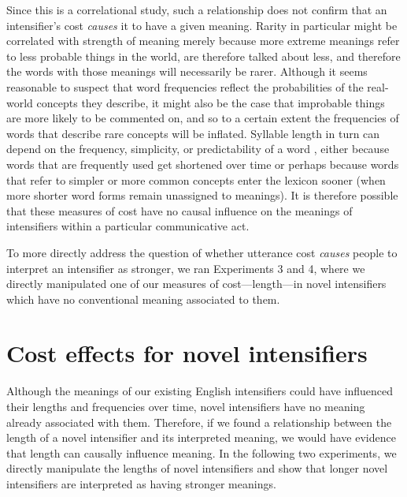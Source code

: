 \documentclass[10pt,letterpaper]{article}
\begin{document}
Since this is a correlational study, such a relationship does not confirm that an intensifier's cost \emph{causes} it to have a given meaning.
Rarity in particular might be correlated with strength of meaning merely because more extreme meanings refer to less probable things in the world, are therefore talked about less, and therefore the words with those meanings will necessarily be rarer.
Although it seems reasonable to suspect that word frequencies reflect the probabilities of the real-world concepts they describe, it might also be the case that improbable things are more likely to be commented on, and so to a certain extent the frequencies of words that describe rare concepts will be inflated. Syllable length in turn can depend on the frequency, simplicity, or predictability of a word \cite{zipf, lewis, piantadosi}, either because words that are frequently used get shortened over time \cite{lewis2015} or perhaps because words that refer to simpler or more common concepts enter the lexicon sooner (when more shorter word forms remain unassigned to meanings). It is therefore possible that these measures of cost have no causal influence on the meanings of intensifiers within a particular communicative act.

To more directly address the question of whether utterance cost \emph{causes} people to interpret an intensifier as stronger, we ran Experiments 3 and 4, where we directly manipulated one of our measures of cost---length---in novel intensifiers which have no conventional meaning associated to them.

\section{Cost effects for novel intensifiers}

Although the meanings of our existing English intensifiers could have influenced their lengths and frequencies over time, novel intensifiers have no meaning already associated with them. Therefore, if we found a relationship between the length of a novel intensifier and its interpreted meaning, we would have evidence that length can causally influence meaning. In the following two experiments, we directly manipulate the lengths of novel intensifiers and show that longer novel intensifiers are interpreted as having stronger meanings.
\end{document}
